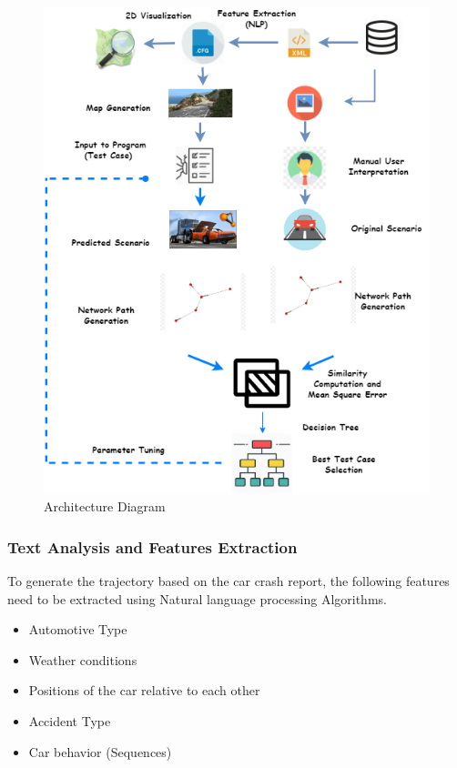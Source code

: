 \begin{figure}[H]
\centering
  \includegraphics[scale= 0.6]{pictures/Architecture_Diagram_AT.png}
  \caption{Architecture Diagram}
\end{figure}

\subsubsection{Text Analysis and Features Extraction}
To generate the trajectory based on the car crash report, the following features need to be extracted using Natural language processing Algorithms. 

\begin{itemize}
  \item	Automotive Type
  \item	Weather conditions
  \item	Positions of the car relative to each other
  \item	Accident Type
  \item	Car behavior (Sequences)

\end{itemize}

